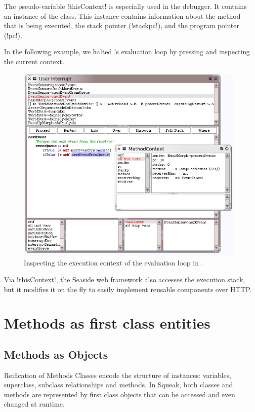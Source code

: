 \documentclass[a4paper,10pt,twoside]{book}
\begin{document}
The pseudo-variable \ct!thisContext! is especially used in the \sq debugger.
It contains an instance of the  class.
This instance contains information about the method that is being executed, the stack pointer (\ct!stackpc!), and the program pointer (\ct!pc!).

In the following example, we halted \sq's evaluation loop by pressing  and inspecting the current context.

\begin{figure}[ht]\centering
	\includegraphics[width=\linewidth]{MethodContext}
	\caption{Inspecting the execution context of the evaluation loop in \sq.\label{fig:MethodContext}}
\end{figure}

Via \ct!thisContext!, the Seaside web framework also accesses the execution stack, but it modifies it on the fly to easily implement reusable components over HTTP.


\section{Methods as first class entities}
\subsection{Methods as Objects} %
Reification of Methods
Classes encode the structure of instances: variables, superclass, subclass relationships and methods. In Squeak, both classes and methods are represented by first class objects that can be accessed and even changed at runtime. 
\end{document}
